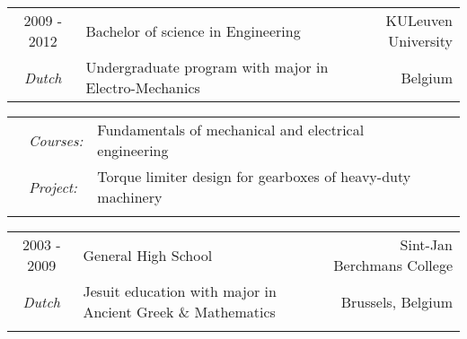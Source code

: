 \documentclass[a4paper,10pt]{article}
\begin{document}
\begin{tabularx}{\textwidth}{cXr}     
\textsc{2009 - 2012} & 
Bachelor of science in Engineering & KULeuven University \\
\textit{Dutch}    	 & 
Undergraduate program with major in Electro-Mechanics & Belgium \\
\end{tabularx}
\begin{tabularx}{\textwidth}{clXr}
\hspace{55pt} & \textit{Courses:} & Fundamentals of mechanical and electrical engineering \\
\hspace{55pt} & \textit{Project:} & Torque limiter design for gearboxes of heavy-duty machinery \\
    & & \\
\end{tabularx}
\begin{tabularx}{\textwidth}{cXr}
\textsc{2003 - 2009} & General High School & Sint-Jan Berchmans College \\
\textit{Dutch}		 & Jesuit education with major in Ancient Greek \& Mathematics & Brussels, Belgium \\
				 	 & & \\
\end{tabularx}
\end{document}
